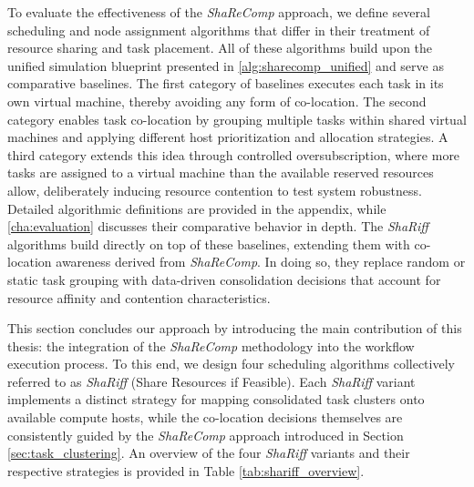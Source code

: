 To evaluate the effectiveness of the \textit{ShaReComp} approach, we define several scheduling and node assignment algorithms that differ in their treatment of resource sharing and task placement. All of these algorithms build upon the unified simulation blueprint presented in \ref{alg:sharecomp_unified} and serve as comparative baselines. The first category of baselines executes each task in its own virtual machine, thereby avoiding any form of co-location. The second category enables task co-location by grouping multiple tasks within shared virtual machines and applying different host prioritization and allocation strategies. A third category extends this idea through controlled oversubscription, where more tasks are assigned to a virtual machine than the available reserved resources allow, deliberately inducing resource contention to test system robustness. Detailed algorithmic definitions are provided in the appendix, while \ref{cha:evaluation} discusses their comparative behavior in depth. The \textit{ShaRiff} algorithms build directly on top of these baselines, extending them with co-location awareness derived from \textit{ShaReComp}. In doing so, they replace random or static task grouping with data-driven consolidation decisions that account for resource affinity and contention characteristics.

\label{sec:co-location_strategies}

This section concludes our approach by introducing the main contribution of this thesis: the integration of the \textit{ShaReComp} methodology into the workflow execution process. To this end, we design four scheduling algorithms collectively referred to as \textit{ShaRiff} (Share Resources if Feasible). Each \textit{ShaRiff} variant implements a distinct strategy for mapping consolidated task clusters onto available compute hosts, while the co-location decisions themselves are consistently guided by the \textit{ShaReComp} approach introduced in Section \ref{sec:task_clustering}. An overview of the four \textit{ShaRiff} variants and their respective strategies is provided in Table \ref{tab:shariff_overview}.

